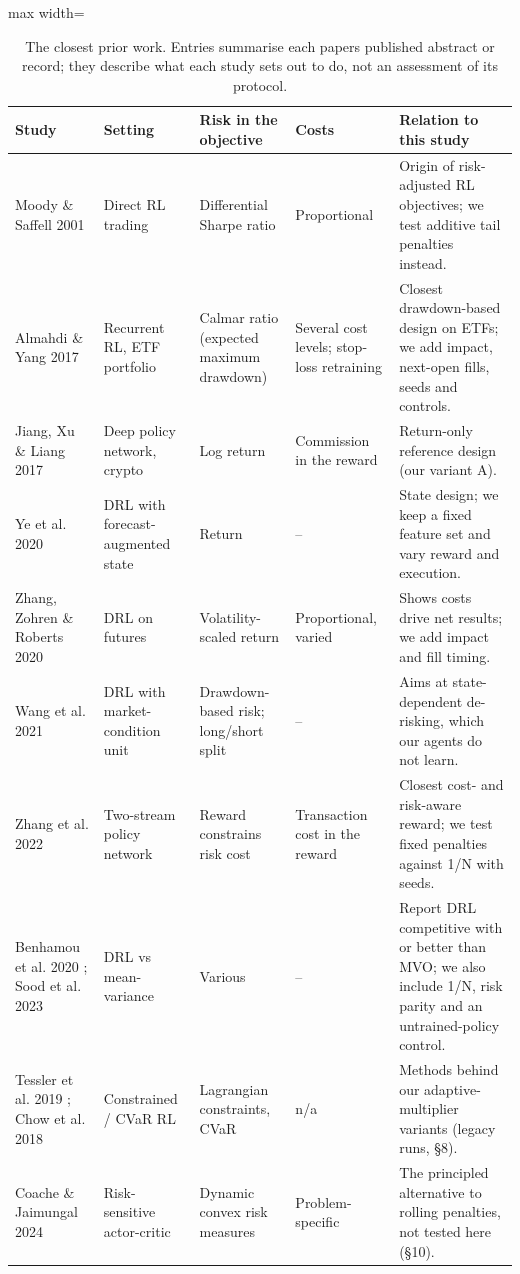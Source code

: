 \documentclass[11pt]{article}
\begin{document}
\begin{table}[!htbp]
\centering\scriptsize
\caption{The closest prior work. Entries summarise each paper\textquotesingle s published abstract or record; they describe what each study sets out to do, not an assessment of its protocol.\label{tab-litmatrix}}
\begin{adjustbox}{max width=\linewidth}
\begin{tabular}{@{}lllll@{}}
\toprule
Study & Setting & Risk in the objective & Costs & Relation to this study \\
\midrule
Moody \& Saffell 2001 \cite{r13} & Direct RL trading & Differential Sharpe ratio & Proportional & Origin of risk-adjusted RL objectives; we test additive tail penalties instead. \\
Almahdi \& Yang 2017 \cite{r47} & Recurrent RL, ETF portfolio & Calmar ratio (expected maximum drawdown) & Several cost levels; stop-loss retraining & Closest drawdown-based design on ETFs; we add impact, next-open fills, seeds and controls. \\
Jiang, Xu \& Liang 2017 \cite{r14} & Deep policy network, crypto & Log return & Commission in the reward & Return-only reference design (our variant A). \\
Ye et al. 2020 \cite{r48} & DRL with forecast-augmented state & Return & -- & State design; we keep a fixed feature set and vary reward and execution. \\
Zhang, Zohren \& Roberts 2020 \cite{r16} & DRL on futures & Volatility-scaled return & Proportional, varied & Shows costs drive net results; we add impact and fill timing. \\
Wang et al. 2021 \cite{r49} & DRL with market-condition unit & Drawdown-based risk; long/short split & -- & Aims at state-dependent de-risking, which our agents do not learn. \\
Zhang et al. 2022 \cite{r50} & Two-stream policy network & Reward constrains risk cost & Transaction cost in the reward & Closest cost- and risk-aware reward; we test fixed penalties against 1/N with seeds. \\
Benhamou et al. 2020 \cite{r51}; Sood et al. 2023 \cite{r52} & DRL vs mean-variance & Various & -- & Report DRL competitive with or better than MVO; we also include 1/N, risk parity and an untrained-policy control. \\
Tessler et al. 2019 \cite{r23}; Chow et al. 2018 \cite{r21} & Constrained / CVaR RL & Lagrangian constraints, CVaR & n/a & Methods behind our adaptive-multiplier variants (legacy runs, \S{}8). \\
Coache \& Jaimungal 2024 \cite{r54} & Risk-sensitive actor-critic & Dynamic convex risk measures & Problem-specific & The principled alternative to rolling penalties, not tested here (\S{}10). \\
\bottomrule
\end{tabular}
\end{adjustbox}
\end{table}
\end{document}
